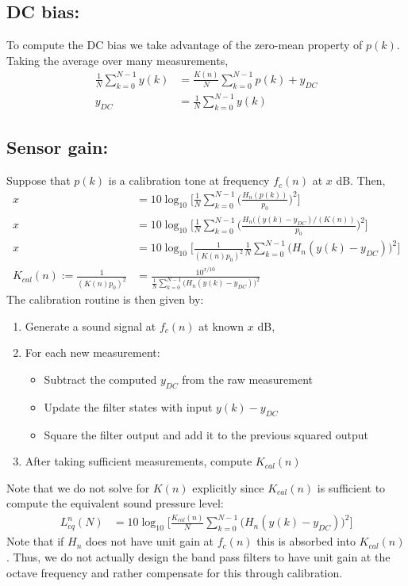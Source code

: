 \documentclass{article}
\begin{document}
\subsection{DC bias:} To compute the DC bias we take advantage of the zero-mean property of $p(k)$. Taking the average over many measurements,
\begin{align*}
    \frac{1}{N} \sum_{k=0}^{N-1} y(k) &= \frac{K(n)}{N} \sum_{k=0}^{N-1} p(k) + y_{DC}
    \\
    y_{DC} &= \frac{1}{N} \sum_{k=0}^{N-1} y(k)
\end{align*}

\subsection{Sensor gain:} Suppose that $p(k)$ is a calibration tone at frequency $f_c(n)$ at $x$ dB. Then,
\begin{align*}
    x &= 10 \log_{10} \bigg[ \frac{1}{N} \sum_{k=0}^{N-1}\bigg(\frac{H_n(p(k))}{p_0} \bigg)^2 \bigg]
    \\
    x &= 10 \log_{10} \bigg[ \frac{1}{N} \sum_{k=0}^{N-1}\bigg(\frac{H_n((y(k)-y_{DC})/(K(n))}{p_0} \bigg)^2 \bigg]
    \\
    x &= 10 \log_{10} \bigg[ \frac{1}{(K(n)p_0)^2} \frac{1}{N} \sum_{k=0}^{N-1}\bigg(H_n(y(k)-y_{DC}) \bigg)^2 \bigg] 
    \\
    K_{cal}(n) :=  \frac{1}{(K(n)p_0)^2} &= \frac{10^{x/10}}{\frac{1}{N} \sum_{k=0}^{N-1}\big(H_n(y(k)-y_{DC})\big)^2} 
\end{align*}
The calibration routine is then given by:
\begin{enumerate}
    \item Generate a sound signal at $f_c(n)$ at known $x$ dB,
    \item For each new measurement:
        \begin{itemize}
            \item Subtract the computed $y_{DC}$ from the raw measurement
            \item Update the filter states with input $y(k) - y_{DC}$
            \item Square the filter output and add it to the previous squared output
        \end{itemize}
    \item After taking sufficient measurements, compute $K_{cal}(n)$
\end{enumerate}
Note that we do not solve for $K(n)$ explicitly since $K_{cal}(n)$ is sufficient to compute the equivalent sound pressure level:
\begin{align*}
    L_{eq}^n(N) &= 10 \log_{10} \bigg[ \frac{K_{cal}(n)}{N} \sum_{k=0}^{N-1}\big(H_n(y(k) - y_{DC})\big)^2 \bigg]
\end{align*}
Note that if $H_n$ does not have unit gain at $f_c(n)$ this is absorbed into $K_{cal}(n)$. Thus, we do not actually design the band pass filters to have unit gain at the octave frequency and rather compensate for this through calibration.
\end{document}
